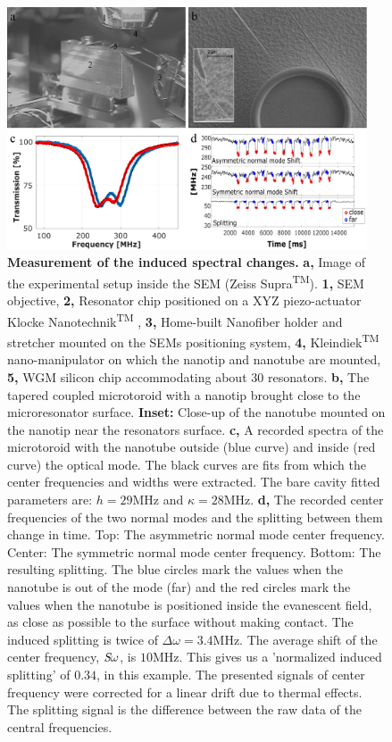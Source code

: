 \documentclass[journal=jacsat,manuscript=article]{achemso}
\begin{document}
\begin{figure}[H]
\centering
          \includegraphics[width=0.95\textwidth]{Images/figure_3_v4.png}
    \caption{\textbf{Measurement of the induced spectral changes.} \textbf{a,} Image of the experimental setup inside the SEM (Zeiss Supra\textsuperscript{TM}). \textbf{1,} SEM objective, \textbf{2,} Resonator chip positioned on a XYZ piezo-actuator Klocke Nanotechnik\textsuperscript{TM} , \textbf{3,} Home-built Nanofiber holder and stretcher mounted on the SEMs positioning system, \textbf{4,} Kleindiek\textsuperscript{TM} nano-manipulator on which the nanotip and nanotube are mounted, \textbf{5,} WGM silicon chip accommodating about 30 resonators. \textbf{b,} The tapered coupled microtoroid with a nanotip brought close to the microresonator surface. \textbf{Inset:} Close-up of the nanotube mounted on the nanotip near the resonators surface. \textbf{c,} A recorded spectra of the microtoroid with the nanotube outside (blue curve) and inside (red curve) the optical mode. The black curves are fits from which the center frequencies and widths were extracted. The bare cavity fitted parameters are: $h=29$MHz and $\kappa=28$MHz. \textbf{d,} The recorded center frequencies of the two normal modes and the splitting between them change in time. Top: The asymmetric normal mode center frequency. Center: The symmetric normal mode center frequency. Bottom: The resulting splitting. The blue circles mark the values when the nanotube is out of the mode (far) and the red circles mark the values when the nanotube is positioned inside the evanescent field, as close as possible to the surface without making contact. The induced splitting is twice of $\Delta \omega = 3.4$MHz. The average shift of the center frequency, $\textit S \omega$, is $10$MHz. This gives us a 'normalized induced splitting' of $0.34$, in this example. The presented signals of center frequency were corrected for a linear drift due to thermal effects. The splitting signal is the difference between the raw data of the central frequencies.
		\label{fig:experiment}}
\end{figure}
\end{document}
